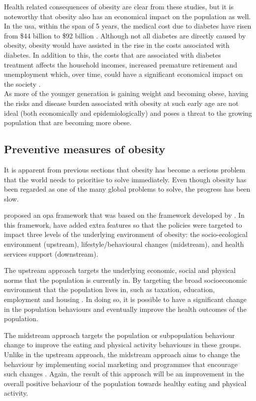 \noindent
Health related consequences of obesity are clear from these studies, but it is noteworthy that obesity also has an economical impact on the population as well.
In the \gls{usa}, within the span of 5 years, the medical cost due to diabetes have risen from \$44 billion to \$92 billion \citep{Yach2006}.
Although not all diabetes are directly caused by obesity, obesity would have assisted in the rise in the costs associated with diabetes.
In addition to this, the costs that are associated with diabetes treatment affects the household incomes, increased premature retirement and unemployment which, over time, could have a significant economical impact on the society \citep{Yach2006}.\\

\noindent
As more of the younger generation is gaining weight and becoming obese, having the risks and disease burden associated with obesity at such early age are not ideal (both economically and epidemiologically) and poses a threat to the growing population that are becoming more obese.

\subsection{Preventive measures of obesity}
\label{sub:preventive_measures_of_obesity}

It is apparent from previous sections that obesity has become a serious problem that the world needs to prioritise to solve immediately.
Even though obesity has been regarded as one of the many global problems to solve, the progress has been slow.

\citet{Sacks2009} proposed an \gls{opa} framework that was based on the framework developed by \citet{WHO2006}.
In this framework, \citet{Sacks2009} have added extra features so that the policies were targeted to impact three levels of the underlying environment of obesity: the socio-ecological environment (upstream), lifestyle/behavioural changes (midstream), and health services support (downstream).

The upstream approach targets the underlying economic, social and physical norms that the population is currently in.
By targeting the broad socioeconomic environment that the population lives in, such as taxation, education, employment and housing \citep{Sacks2009}.
In doing so, it is possible to have a significant change in the population behaviours and eventually improve the health outcomes of the population.

The midstream approach targets the population or subpopulation behaviour change to improve the eating and physical activity behaviours in these groups.
Unlike in the upstream approach, the midstream approach aims to change the behaviour by implementing social marketing and programmes that encourage such changes \citet{Sacks2009}.
Again, the result of this approach will be an improvement in the overall positive behaviour of the population towards healthy eating and physical activity.

